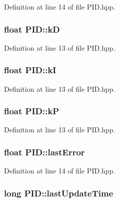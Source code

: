 Definition at line 14 of file P\-I\-D.\-hpp.

\hypertarget{classPID_a5a07dca1e267a62af08ebd07781f1e9e}{
\subsubsection[{k\-D}]{\setlength{\rightskip}{0pt plus 5cm}float P\-I\-D\-::k\-D}}\label{classPID_a5a07dca1e267a62af08ebd07781f1e9e}


Definition at line 13 of file P\-I\-D.\-hpp.

\hypertarget{classPID_ac686925341bcab06b11df109533b6807}{
\subsubsection[{k\-I}]{\setlength{\rightskip}{0pt plus 5cm}float P\-I\-D\-::k\-I}}\label{classPID_ac686925341bcab06b11df109533b6807}


Definition at line 13 of file P\-I\-D.\-hpp.

\hypertarget{classPID_ac4815cca85109a6e13b10c2415104328}{
\subsubsection[{k\-P}]{\setlength{\rightskip}{0pt plus 5cm}float P\-I\-D\-::k\-P}}\label{classPID_ac4815cca85109a6e13b10c2415104328}


Definition at line 13 of file P\-I\-D.\-hpp.

\hypertarget{classPID_abf0cc22331707048925c27a242be7d3e}{
\subsubsection[{last\-Error}]{\setlength{\rightskip}{0pt plus 5cm}float P\-I\-D\-::last\-Error}}\label{classPID_abf0cc22331707048925c27a242be7d3e}


Definition at line 14 of file P\-I\-D.\-hpp.

\hypertarget{classPID_ac544c553fc46b395600413117df8a1f8}{
\subsubsection[{last\-Update\-Time}]{\setlength{\rightskip}{0pt plus 5cm}long P\-I\-D\-::last\-Update\-Time}}\label{classPID_ac544c553fc46b395600413117df8a1f8}


